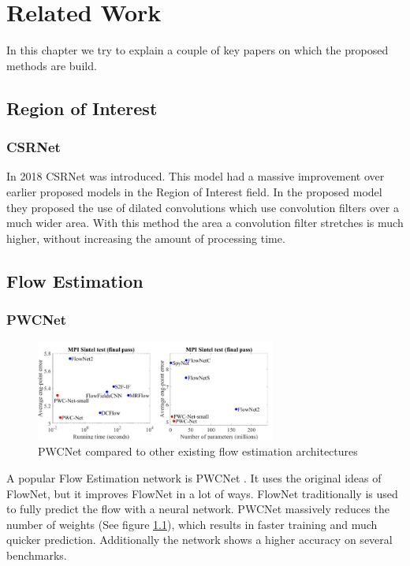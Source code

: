 \chapter{Related Work}
In this chapter we try to explain a couple of key papers on which the proposed methods are build.

\section{Region of Interest}
\subsection{CSRNet}
In 2018 CSRNet \cite{li2018csrnet} was introduced. This model had a massive improvement over earlier proposed models in the Region of Interest field. In the proposed model they proposed the use of dilated convolutions which use convolution filters over a much wider area. With this method the area a convolution filter stretches is much higher, without increasing the amount of processing time.
\section{Flow Estimation}

\subsection{PWCNet}

\begin{figure}[h]
\centering
\includegraphics[width=0.7\textwidth]{images/pwcnet_improvements}
\caption{PWCNet compared to other existing flow estimation architectures}
\label{fig:pwc_compare}
\end{figure}

A popular Flow Estimation network is PWCNet \cite{sun_pwc-net_2018}. It uses the original ideas of FlowNet, but it improves FlowNet in a lot of ways. FlowNet traditionally is used to fully predict the flow with a neural network. PWCNet massively reduces the number of weights (See figure \ref{fig:pwc_compare}), which results in faster training and much quicker prediction. Additionally the network shows a higher accuracy on several benchmarks.

